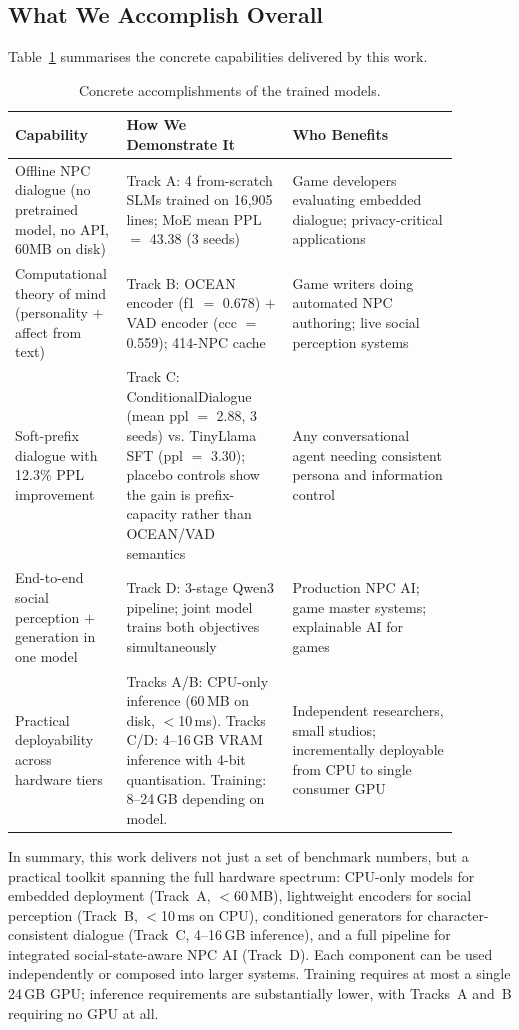 \documentclass[11pt]{article}
\begin{document}
\subsection{What We Accomplish Overall}

Table~\ref{tab:accomplish} summarises the concrete capabilities delivered by this work.

\begin{table}[h]
\centering
\caption{Concrete accomplishments of the trained models.}
\label{tab:accomplish}
\small
\begin{tabular}{@{}p{0.18\linewidth}p{0.35\linewidth}p{0.35\linewidth}@{}}
\toprule
\textbf{Capability} & \textbf{How We Demonstrate It} & \textbf{Who Benefits} \\
\midrule
Offline NPC dialogue (no pretrained model, no API, 60MB on disk)
    & Track A: 4 from-scratch SLMs trained on 16,905 lines; MoE mean PPL $=$ 43.38 (3 seeds)
    & Game developers evaluating embedded dialogue; privacy-critical applications \\
\midrule
Computational theory of mind (personality $+$ affect from text)
    & Track B: OCEAN encoder (f1 $=$ 0.678) $+$ VAD encoder (ccc $=$ 0.559); 414-NPC cache
    & Game writers doing automated NPC authoring; live social perception systems \\
\midrule
Soft-prefix dialogue with 12.3\% PPL improvement
    & Track C: ConditionalDialogue (mean ppl $=$ 2.88, 3 seeds) vs. TinyLlama SFT (ppl $=$ 3.30); placebo controls show the gain is prefix-capacity rather than OCEAN/VAD semantics
    & Any conversational agent needing consistent persona and information control \\
\midrule
End-to-end social perception $+$ generation in one model
    & Track D: 3-stage Qwen3 pipeline; joint model trains both objectives simultaneously
    & Production NPC AI; game master systems; explainable AI for games \\
\midrule
Practical deployability across hardware tiers
    & Tracks A/B: CPU-only inference (60\,MB on disk, {$<$}10\,ms). Tracks C/D: 4--16\,GB VRAM inference with 4-bit quantisation. Training: 8--24\,GB depending on model.
    & Independent researchers, small studios; incrementally deployable from CPU to single consumer GPU \\
\bottomrule
\end{tabular}
\end{table}

In summary, this work delivers not just a set of benchmark numbers, but a practical toolkit spanning the full hardware spectrum: CPU-only models for embedded deployment (Track~A, {$<$}60\,MB), lightweight encoders for social perception (Track~B, {$<$}10\,ms on CPU), conditioned generators for character-consistent dialogue (Track~C, 4--16\,GB inference), and a full pipeline for integrated social-state-aware NPC AI (Track~D).
Each component can be used independently or composed into larger systems.
Training requires at most a single 24\,GB GPU; inference requirements are substantially lower, with Tracks~A and~B requiring no GPU at all.
\end{document}
